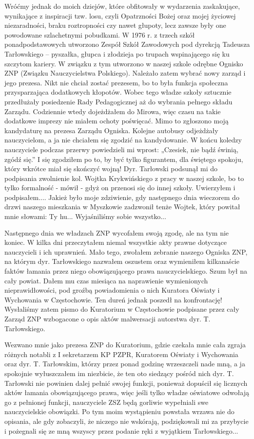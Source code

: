 Wróćmy jednak do moich dziejów, które obfitowały w wydarzenia zaskakujące, wynikające z inspiracji tzw. losu, czyli Opatrzności Bożej oraz mojej życiowej niezaradności, braku roztropności czy nawet głupoty, lecz zawsze były one powodowane szlachetnymi pobudkami. W 1976 r.  z trzech szkół ponadpodstawowych utworzono Zespół Szkół Zawodowych pod dyrekcją Tadeusza Tarłowskiego – pyszałka, głupca i złodzieja po trupach wspinającego się ku szczytom kariery. W związku z tym utworzono w naszej szkole odrębne Ognisko ZNP (Związku Nauczycielstwa Polskiego). Należało zatem wybrać nowy zarząd i jego prezesa. Nikt nie chciał zostać prezesem, bo to była funkcja społeczna przysparzająca dodatkowych kłopotów. Wobec tego władze szkoły sztucznie przedłużały posiedzenie Rady Pedagogicznej aż do wybrania pełnego składu Zarządu. Codziennie wtedy dojeżdżałem do Mirowa, więc czasu na takie dodatkowe imprezy nie miałem ochoty poświęcać. Mimo to zgłoszono moją kandydaturę na prezesa Zarządu Ogniska. Kolejne autobusy odjeżdżały nauczycielom, a ja nie chciałem się zgodzić na kandydowanie. W końcu koledzy nauczyciele podczas przerwy powiedzieli mi wprost: „Czesiek, nie bądź świnią, zgódź się.” I się zgodziłem po to, by być tylko figurantem, dla świętego spokoju, który wkrótce miał się skończyć wojną! Dyr. Tarłowski podsunął mi do podpisania zwolnienie kol. Wojtka Krykwińskiego z pracy w naszej szkole, bo to tylko formalność - mówił - gdyż on przenosi się do innej szkoły. Uwierzyłem i podpisałem.... Jakież było moje zdziwienie, gdy następnego dnia wieczorem do drzwi naszego mieszkania w Myszkowie zadzwonił tenże Wojtek, który powitał mnie słowami: Ty hu... Wyjaśniliśmy sobie wszystko...

Następnego dnia we władzach ZNP wycofałem swoją zgodę, ale na tym nie koniec. W kilka dni przeczytałem niemal wszystkie akty prawne dotyczące nauczycieli i ich uprawnień. Mało tego, zwołałem zebranie naszego Ogniska ZNP, na którym dyr. Tarłowskiego nazwałem oszustem oraz wymieniłem kilkanaście faktów łamania przez niego obowiązującego prawa nauczycielskiego. Szum był na cały powiat. Dałem mu czas miesiąca na naprawienie wymienionych nieprawidłowości, pod groźbą powiadomienia o nich Kuratora Oświaty i Wychowania w Częstochowie. Ten dureń jednak poszedł na konfrontację! Wysłaliśmy zatem pismo do Kuratorium w Częstochowie podpisane przez cały Zarząd ZNP wzbogacone o opis aktów malwersacji autorstwa dyr. T. Tarłowskiego.

Wezwano mnie jako prezesa ZNP do Kuratorium, gdzie czekała mnie cała zgraja różnych notabli z I sekretarzem KP PZPR, Kuratorem Oświaty i Wychowania oraz dyr. T. Tarłowskim, którzy przez ponad godzinę wrzeszczeli nade mną, a ja spokojnie wyłuszczałem im niezbicie, że ten oto siedzący pośród nich dyr. T. Tarłowski nie powinien dalej pełnić swojej funkcji, ponieważ dopuścił się licznych aktów łamania obowiązującego prawa, więc jeśli tylko władze oświatowe odwołają go z pełnionej funkcji, nauczyciele ZSZ będą gorliwie wypełniali swe nauczycielskie obowiązki. Po tym moim wystąpieniu powstała wrzawa nie do opisania, ale gdy zobaczyli, że niczego nie wskórają, podziękowali mi za przybycie i pożegnali się ze mną wszyscy przez podanie ręki z wyjątkiem Tarłowskiego...

